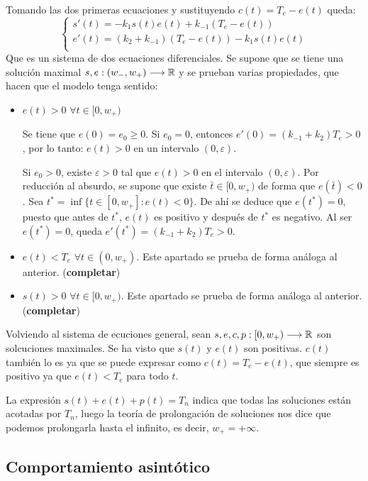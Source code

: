 Tomando las dos primeras ecuaciones y sustituyendo $c(t)=T_e-e(t)$ queda:
\[
\left\{
\begin{array}{l}
s'(t)=-k_1s(t)e(t)+k_{-1}(T_e-e(t))\\
e'(t)=\left(k_2+k_{-1}\right)(T_e-e(t))-k_1s(t)e(t)\\
\end{array}
\right.
\]
Que es un sistema de dos ecuaciones diferenciales. Se supone que se tiene una solución maximal $s,e : (w_-,w_+) \longrightarrow \mathbb{R}$ y se prueban varias propiedades, que hacen que el modelo tenga sentido:
\begin{itemize}
\item $e(t)>0$ $\forall t\in[0,w_+)$

Se tiene que $e(0)=e_0\geq 0$. Si $e_0=0$, entonces $e'(0)=(k_{-1}+k_2)T_e>0$, por lo tanto: $e(t)>0$ en un intervalo $(0,\varepsilon)$.

Si $e_0>0$, existe $\varepsilon>0$ tal que $e(t)>0$ en el intervalo $(0,\varepsilon)$. Por reducción al absurdo, se supone que existe $\bar{t}\in[0,w_+)$ de forma que $e(\bar{t})<0$. Sea $t^*=\inf\{t\in[0,w_+]:e(t)<0\}$. De ahí se deduce que $e(t^*)=0$, puesto que antes de $t^*$, $e(t)$ es positivo y después de $t^*$ es negativo. Al ser $e(t^*)=0$, queda $e'(t^*)=(k_{-1}+k_2)T_e>0$.

\item $e(t)<T_e$ $\forall t\in(0,w_+)$. Este apartado se prueba de forma análoga al anterior. (\textbf{completar})
\item $s(t)>0$ $\forall t \in[0,w_+)$. Este apartado se prueba de forma análoga al anterior. (\textbf{completar})
\end{itemize}

Volviendo al sistema de ecuciones general, sean $s,e,c,p : [0,w_+) \longrightarrow \mathbb{R}$ son solcuciones maximales. Se ha visto que $s(t)$ y $e(t)$ son positivas. $c(t)$ también lo es ya que se puede expresar como $c(t)=T_e-e(t)$, que siempre es positivo ya que $e(t)<T_e$ para todo $t$.

La expresión $s(t)+e(t)+p(t)=T_n$ indica que todas las soluciones están acotadas por $T_n$, luego la teoría de prolongación de soluciones nos dice que podemos prolongarla hasta el infinito, es decir, $w_+=+\infty$.

\subsection{Comportamiento asintótico}


